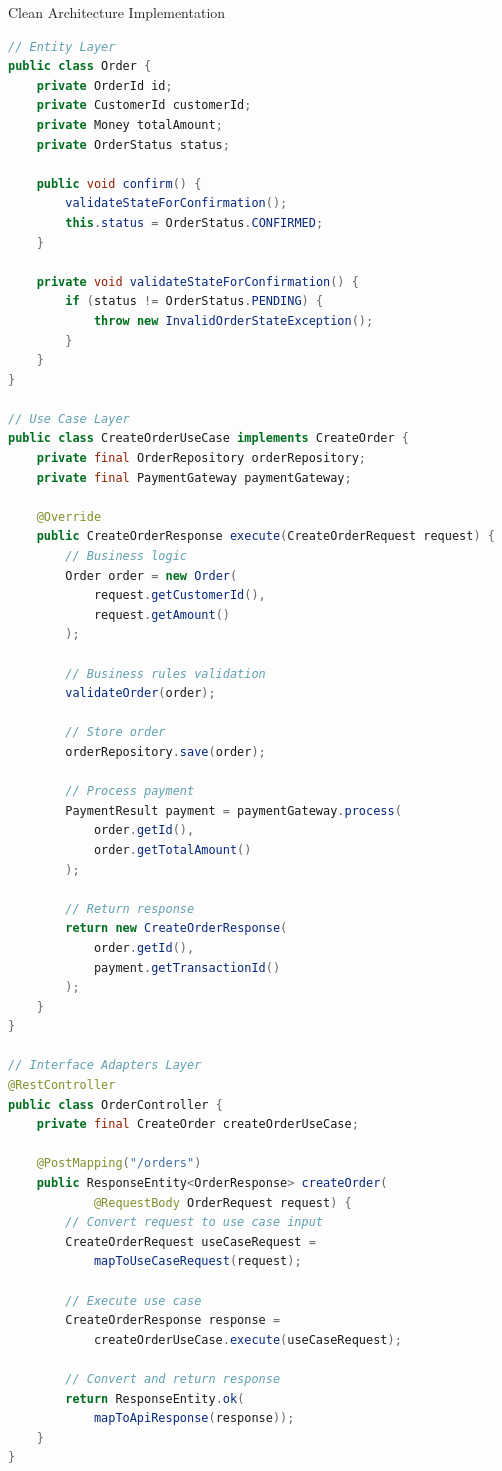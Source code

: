 \columnbreak

\begin{example2}[breakable]{Clean Architecture Implementation}
\begin{lstlisting}[language=Java, style=basesmol]
// Entity Layer
public class Order {
    private OrderId id;
    private CustomerId customerId;
    private Money totalAmount;
    private OrderStatus status;
    
    public void confirm() {
        validateStateForConfirmation();
        this.status = OrderStatus.CONFIRMED;
    }
    
    private void validateStateForConfirmation() {
        if (status != OrderStatus.PENDING) {
            throw new InvalidOrderStateException();
        }
    }
}

// Use Case Layer
public class CreateOrderUseCase implements CreateOrder {
    private final OrderRepository orderRepository;
    private final PaymentGateway paymentGateway;
    
    @Override
    public CreateOrderResponse execute(CreateOrderRequest request) {
        // Business logic
        Order order = new Order(
            request.getCustomerId(),
            request.getAmount()
        );
        
        // Business rules validation
        validateOrder(order);
        
        // Store order
        orderRepository.save(order);
        
        // Process payment
        PaymentResult payment = paymentGateway.process(
            order.getId(),
            order.getTotalAmount()
        );
        
        // Return response
        return new CreateOrderResponse(
            order.getId(),
            payment.getTransactionId()
        );
    }
}

// Interface Adapters Layer
@RestController
public class OrderController {
    private final CreateOrder createOrderUseCase;
    
    @PostMapping("/orders")
    public ResponseEntity<OrderResponse> createOrder(
            @RequestBody OrderRequest request) {
        // Convert request to use case input
        CreateOrderRequest useCaseRequest = 
            mapToUseCaseRequest(request);
        
        // Execute use case
        CreateOrderResponse response = 
            createOrderUseCase.execute(useCaseRequest);
        
        // Convert and return response
        return ResponseEntity.ok(
            mapToApiResponse(response));
    }
}


\end{lstlisting}
\end{example2}
